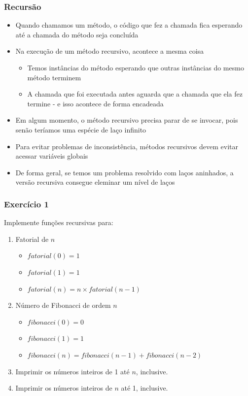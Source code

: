 \documentclass[xcolor={dvipsnames,table},aspectratio=169]{beamer}
\begin{document}
\begin{frame}[fragile]\frametitle{Recursão}
\begin{itemize}
    \item Quando chamamos um método, o código que fez a chamada fica esperando até a chamada do método seja concluída
    \item Na execução de um método recursivo, acontece a mesma coisa
    \begin{itemize}
        \item Temos instâncias do método esperando que outras instâncias do mesmo método terminem
        \item A chamada que foi executada antes aguarda que a chamada que ela fez termine - e isso acontece de forma encadeada
    \end{itemize}
    \item Em algum momento, o método recursivo precisa parar de se invocar, pois senão teríamos uma espécie de laço infinito
    \item Para evitar problemas de inconsistência, métodos recursivos devem evitar acessar variáveis globais
    \item De forma geral, se temos um problema resolvido com laços aninhados, a versão recursiva consegue eleminar um nível de laços
\end{itemize}
\end{frame}

\begin{frame}\frametitle{Exercício 1}
Implemente funções recursivas para:
\begin{enumerate}
	\item Fatorial de $n$
    \begin{itemize}
        \item $fatorial(0) = 1$
        \item $fatorial(1) = 1$
        \item $fatorial(n) = n \times fatorial(n-1)$
    \end{itemize}
	\item Número de Fibonacci de ordem $n$
	\begin{itemize}
        \item $fibonacci(0) = 0$
        \item $fibonacci(1) = 1$
        \item $fibonacci(n) = fibonacci(n-1) + fibonacci(n-2)$
    \end{itemize}
	\item Imprimir os números inteiros de 1 até $n$, inclusive.
	\item Imprimir os números inteiros de $n$ até 1, inclusive.
\end{enumerate}
\end{frame}
\end{document}
